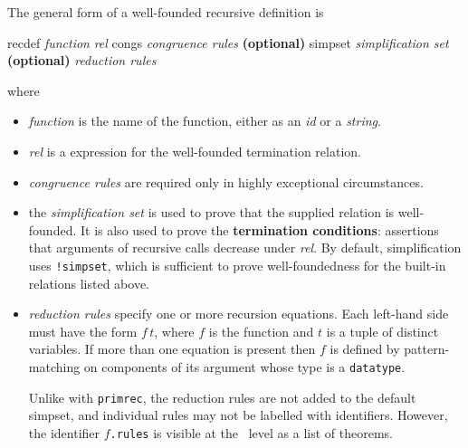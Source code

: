 The general form of a well-founded recursive definition is
\begin{ttbox}
recdef {\it function} {\it rel}
    congs   {\it congruence rules}      {\bf(optional)}
    simpset {\it simplification set}      {\bf(optional)}
   {\it reduction rules}
\end{ttbox}
where
\begin{itemize}
\item \textit{function} is the name of the function, either as an \textit{id}
  or a \textit{string}.  
  
\item \textit{rel} is a {\HOL} expression for the well-founded termination
  relation.
  
\item \textit{congruence rules} are required only in highly exceptional
  circumstances.
  
\item the \textit{simplification set} is used to prove that the supplied
  relation is well-founded.  It is also used to prove the \textbf{termination
    conditions}: assertions that arguments of recursive calls decrease under
  \textit{rel}.  By default, simplification uses \texttt{!simpset}, which
  is sufficient to prove well-foundedness for the built-in relations listed
  above. 
  
\item \textit{reduction rules} specify one or more recursion equations.  Each
  left-hand side must have the form $f\,t$, where $f$ is the function and $t$
  is a tuple of distinct variables.  If more than one equation is present then
  $f$ is defined by pattern-matching on components of its argument whose type
  is a \texttt{datatype}.  

  Unlike with \texttt{primrec}, the reduction rules are not added to the
  default simpset, and individual rules may not be labelled with identifiers.
  However, the identifier $f$\texttt{.rules} is visible at the \ML\ level
  as a list of theorems.
\end{itemize}

